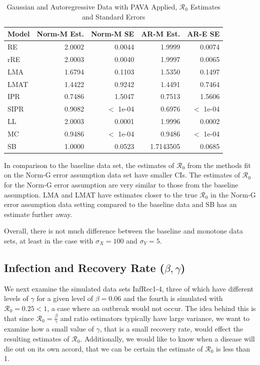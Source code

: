 \documentclass[12pt]{article}
\newcommand{\rr}{\ensuremath{\mathcal{R}_0}}
\begin{document}
\begin{table}[H]
	
	\centering
	\begin{tabular}[t]{l|r|r|r|r}
		\hline
		Model & Norm-M Est. & Norm-M SE & AR-M Est. & AR-E SE\\
		\hline
		RE & 2.0002 & 0.0044 & 1.9999 & 0.0074\\
		\hline
		rRE & 2.0003 & 0.0040 & 1.9997 & 0.0065\\
		\hline
		LMA & 1.6794 & 0.1103 & 1.5350 & 0.1497\\
		\hline
		LMAT & 1.4422 & 0.9242 & 1.4491 & 0.7464\\
		\hline
		IPR & 0.7486 & 1.5047 & 0.7513 & 1.5606\\
		\hline
		SIPR & 0.9082 & $<$ 1e-04 & 0.6976 & $<$ 1e-04\\
		\hline
		LL & 2.0003 & 0.0001 & 1.9996 & 0.0002\\
		\hline
		MC & 0.9486 & $<$ 1e-04 & 0.9486 & $<$ 1e-04\\
		\hline
		SB & 1.0000 & 0.0523 & 1.7143505 & 0.0685\\
		\hline
	\end{tabular}
\caption{Gaussian and Autoregressive Data with PAVA Applied, $\rr$ Estimates and Standard Errors}\label{tab:pava-res}
\end{table}

In comparison to the baseline data set, the estimates of $\rr$ from the methods fit on the Norm-G error assumption data set have smaller CIs.  The estimates of $\rr$ for the Norm-G error assumption are very similar to those from the baseline assumption.  LMA and LMAT have estimates closer to the true $\rr$ in the Norm-G error assumption data setting compared to the baseline data and SB has an estimate further away.

Overall, there is not much difference between the baseline and monotone data sets, at least in the case with $\sigma_X=100$ and $\sigma_Y=5$.  

\subsection{Infection and Recovery Rate ($\beta, \gamma$)}\label{sec:res-beta-gamma}

We next examine the simulated data sets InfRec1-4, three of which have different levels of $\gamma$ for a given level of $\beta = 0.06$ and the fourth is simulated with $\rr=0.25 < 1$, a case where an outbreak would not occur.  The idea behind this is that since $\rr=\frac{\beta}{\gamma}$ and ratio estimators typically have large variance, we want to examine how a small value of $\gamma$, that is a small recovery rate, would effect the resulting estimates of $\rr$.  Additionally, we would like to know when a disease will die out on its own accord, that we can be certain the estimate of $\rr$ is less than 1.
\end{document}
